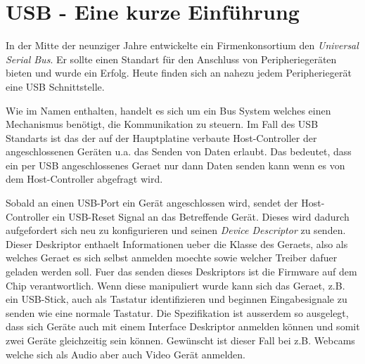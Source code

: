 \chapter{USB - Eine kurze Einführung}
In der Mitte der neunziger Jahre entwickelte ein Firmenkonsortium den \textit{Universal Serial Bus}.
Er sollte einen Standart für den Anschluss von Peripheriegeräten bieten und wurde ein Erfolg.
Heute finden sich an nahezu jedem Peripheriegerät eine USB Schnittstelle.

Wie im Namen enthalten, handelt es sich um ein Bus System welches einen Mechanismus benötigt, die Kommunikation zu steuern.
Im Fall des USB Standarts ist das der auf der Hauptplatine verbaute Host-Controller der angeschlossenen Geräten u.a. das Senden von Daten erlaubt.
Das bedeutet, dass ein per USB angeschlossenes Geraet nur dann Daten senden kann wenn es von dem Host-Controller abgefragt wird.

Sobald an einen USB-Port ein Gerät angeschlossen wird, sendet der Host-Controller ein USB-Reset Signal an das Betreffende Gerät.
Dieses wird dadurch aufgefordert sich neu zu konfigurieren und seinen \textit{Device Descriptor} zu senden.
Dieser Deskriptor enthaelt Informationen ueber die Klasse des Geraets, also als welches Geraet es sich selbst anmelden moechte sowie welcher Treiber dafuer geladen werden soll.
Fuer das senden dieses Deskriptors ist die Firmware auf dem Chip verantwortlich.
Wenn diese manipuliert wurde kann sich das Geraet, z.B. ein USB-Stick, auch als
Tastatur identifizieren und beginnen Eingabesignale zu senden wie eine normale
Tastatur.
Die Spezifikation ist ausserdem so ausgelegt, dass sich Geräte auch mit einem
Interface Deskriptor anmelden können und somit zwei Geräte gleichzeitig sein
können.
Gewünscht ist dieser Fall bei z.B. Webcams welche sich als Audio aber auch Video
Gerät anmelden.
